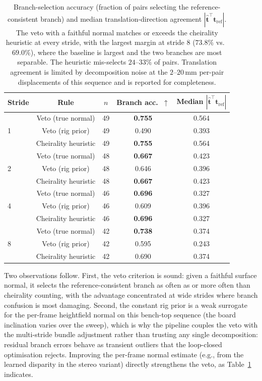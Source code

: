 \documentclass[review]{elsarticle}
\begin{document}
\begin{table}[h]
\centering
\caption{Branch-selection accuracy (fraction of pairs selecting the reference-consistent branch) and median translation-direction agreement $|\hat{\mathbf{t}}^\top\mathbf{t}_{\mathrm{ref}}|$. The veto with a faithful normal matches or exceeds the cheirality heuristic at every stride, with the largest margin at stride 8 ($73.8\%$ vs.\ $69.0\%$), where the baseline is largest and the two branches are most separable. The heuristic mis-selects $24$--$33\%$ of pairs. Translation agreement is limited by decomposition noise at the $2$--$20$\,mm per-pair displacements of this sequence and is reported for completeness.}
\label{tab:supp_veto}
\setlength{\tabcolsep}{4pt}
\renewcommand{\arraystretch}{1.08}
\footnotesize
\begin{tabular}{lcccc}
\toprule
Stride & Rule & $n$ & Branch acc.\ $\uparrow$ & Median $|\hat{\mathbf{t}}^\top\mathbf{t}_{\mathrm{ref}}|$ \\
\midrule
\multirow{3}{*}{1} & Veto (true normal) & 49 & \textbf{0.755} & 0.564 \\
 & Veto (rig prior) & 49 & 0.490 & 0.393 \\
 & Cheirality heuristic & 49 & \textbf{0.755} & 0.564 \\
\midrule
\multirow{3}{*}{2} & Veto (true normal) & 48 & \textbf{0.667} & 0.423 \\
 & Veto (rig prior) & 48 & 0.646 & 0.396 \\
 & Cheirality heuristic & 48 & \textbf{0.667} & 0.423 \\
\midrule
\multirow{3}{*}{4} & Veto (true normal) & 46 & \textbf{0.696} & 0.327 \\
 & Veto (rig prior) & 46 & 0.609 & 0.396 \\
 & Cheirality heuristic & 46 & \textbf{0.696} & 0.327 \\
\midrule
\multirow{3}{*}{8} & Veto (true normal) & 42 & \textbf{0.738} & 0.374 \\
 & Veto (rig prior) & 42 & 0.595 & 0.243 \\
 & Cheirality heuristic & 42 & 0.690 & 0.374 \\
\bottomrule
\end{tabular}
\end{table}

Two observations follow. First, the veto criterion is sound: given a faithful surface normal, it selects the reference-consistent branch as often as or more often than cheirality counting, with the advantage concentrated at wide strides where branch confusion is most damaging. Second, the constant rig prior is a weak surrogate for the per-frame heightfield normal on this bench-top sequence (the board inclination varies over the sweep), which is why the pipeline couples the veto with the multi-stride bundle adjustment rather than trusting any single decomposition: residual branch errors behave as transient outliers that the loop-closed optimisation rejects. Improving the per-frame normal estimate (e.g., from the learned disparity in the stereo variant) directly strengthens the veto, as Table~\ref{tab:supp_veto} indicates.
\end{document}
